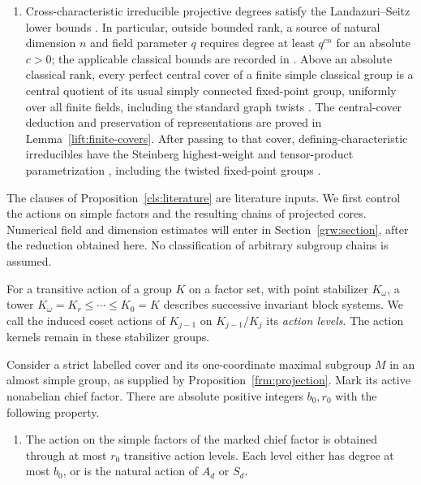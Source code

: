 \begin{proposition}
\begin{enumerate}[label=\textup{(L\arabic*)}]
maximal in every maximal overgroup. This is the hypothesis imposed
whenever the result is used.
\item Cross-characteristic irreducible projective degrees satisfy the
Landazuri--Seitz lower bounds \cite{LandazuriSeitz1974}.  In particular,
outside bounded rank, a source of natural dimension $n$ and field parameter $q$ requires
degree at least $q^{c n}$ for an absolute $c>0$; the applicable
classical bounds are recorded in \cite[Tables~3--6]{Hasa2014}.
Above an absolute classical rank, every perfect central cover of a
finite simple classical group is a central quotient of its usual
simply connected fixed-point group, uniformly over all finite fields,
including the standard graph twists
\cite[Theorem~1.1 and p.~528]{Steinberg1981}.
The central-cover deduction and preservation of representations
are proved in Lemma~\ref{lift:finite-covers}.
After passing to that cover, defining-characteristic irreducibles
have the Steinberg highest-weight and tensor-product parametrization
\cite[Theorems~1.1 and~1.3]{Steinberg1963}, including the twisted
fixed-point groups \cite[Theorem~43]{SteinbergNotes}.
\end{enumerate}
\end{proposition}

The clauses of Proposition~\ref{cls:literature} are literature inputs.
We first control the actions on simple factors and the resulting chains
of projected cores. Numerical field and dimension estimates will enter in
Section~\ref{grw:section}, after the reduction obtained here. No classification of arbitrary subgroup
chains is assumed.

For a transitive action of a group $K$ on a factor set, with point
stabilizer $K_\omega$, a tower
$K_\omega=K_r\leq\cdots\leq K_0=K$ describes successive invariant
block systems. We call the induced coset actions of $K_{j-1}$ on
$K_{j-1}/K_j$ its \emph{action levels}. The action kernels remain in
these stabilizer groups.

\begin{proposition}\label{cls:factor-actions}
Consider a strict labelled cover and its one-coordinate maximal subgroup
$M$ in an almost simple group, as supplied by
Proposition~\ref{frm:projection}. Mark its active nonabelian chief factor.
There are absolute positive integers $b_0,r_0$ with the following property.
\begin{enumerate}[label=\textup{(C\arabic*)}]
\item\label{cls:cat-actions}
The action on the simple factors of the marked chief factor is obtained
through at most $r_0$ transitive action levels.  Each level either has
degree at most $b_0$, or is the natural action of $A_d$ or $S_d$.
\end{enumerate}
\end{proposition}

